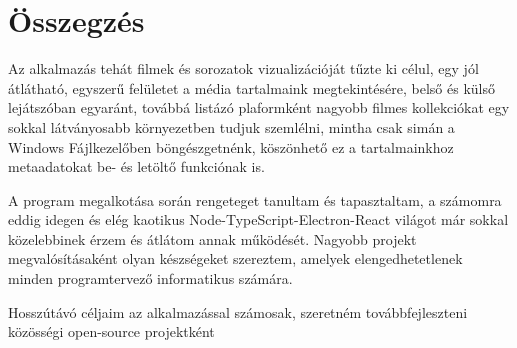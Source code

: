 \chapter{Összegzés} %
\label{ch:sum}

Az alkalmazás tehát filmek és sorozatok vizualizációját tűzte ki célul, egy jól átlátható, egyszerű felületet a média tartalmaink megtekintésére, belső és külső lejátszóban egyaránt, továbbá listázó plaformként nagyobb filmes kollekciókat egy sokkal látványosabb környezetben tudjuk szemlélni, mintha csak simán a Windows Fájlkezelőben böngészgetnénk, köszönhető ez a tartalmainkhoz metaadatokat be- és letöltő funkciónak is.

A program megalkotása során rengeteget tanultam és tapasztaltam, a számomra eddig idegen és elég kaotikus Node-TypeScript-Electron-React világot már sokkal közelebbinek érzem és átlátom annak működését. Nagyobb projekt megvalósításaként olyan készségeket szereztem, amelyek elengedhetetlenek minden programtervező informatikus számára.

Hosszútávó céljaim az alkalmazással számosak, szeretném továbbfejleszteni közösségi open-source projektként
